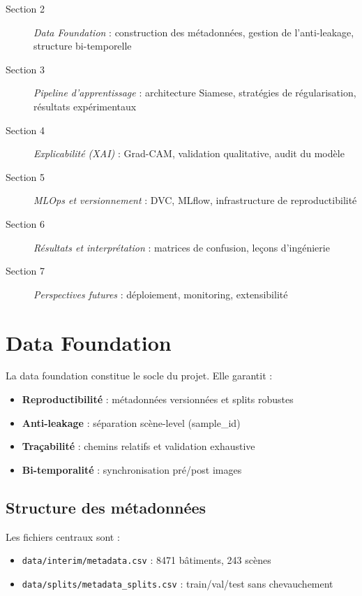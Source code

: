 \documentclass[12pt,a4paper]{article}
\begin{document}
\begin{description}
    \item[Section 2] \textit{Data Foundation} : construction des métadonnées, gestion de l'anti-leakage, structure bi-temporelle
    \item[Section 3] \textit{Pipeline d'apprentissage} : architecture Siamese, stratégies de régularisation, résultats expérimentaux
    \item[Section 4] \textit{Explicabilité (XAI)} : Grad-CAM, validation qualitative, audit du modèle
    \item[Section 5] \textit{MLOps et versionnement} : DVC, MLflow, infrastructure de reproductibilité
    \item[Section 6] \textit{Résultats et interprétation} : matrices de confusion, leçons d'ingénierie
    \item[Section 7] \textit{Perspectives futures} : déploiement, monitoring, extensibilité
\end{description}

\newpage

\section{Data Foundation}

La data foundation constitue le socle du projet. Elle garantit :
\begin{itemize}
    \item \textbf{Reproductibilité} : métadonnées versionnées et splits robustes
    \item \textbf{Anti-leakage} : séparation scène-level (sample\_id)
    \item \textbf{Traçabilité} : chemins relatifs et validation exhaustive
    \item \textbf{Bi-temporalité} : synchronisation pré/post images
\end{itemize}

\subsection{Structure des métadonnées}
Les fichiers centraux sont :
\begin{itemize}
    \item \texttt{data/interim/metadata.csv} : 8471 bâtiments, 243 scènes
    \item \texttt{data/splits/metadata\_splits.csv} : train/val/test sans chevauchement
\end{itemize}
\end{document}

